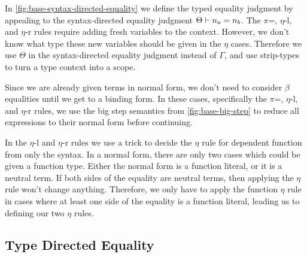 In \autoref{fig:base-syntax-directed-equality} we define the typed equality judgment by appealing to the syntax-directed equality judgment $\Theta \vdash n_a = n_b$.
The $\pi$=, $\eta$-l, and $\eta$-r rules require adding fresh variables to the context.
However, we don't know what type these new variables should be given in the $\eta$ cases.
Therefore we use $\Theta$ in the syntax-directed equality judgment instead of $\Gamma$, and use strip-types to turn a type context into a scope.

Since we are already given terms in normal form, we don't need to consider $\beta$ equalities until we get to a binding form.
In these cases, specifically the $\pi$=, $\eta$-l, and $\eta$-r rules, we use the big step semantics from \autoref{fig:base-big-step} to reduce all expressions to their normal form before continuing.

In the $\eta$-l and $\eta$-r rules we use a trick to decide the $\eta$ rule for dependent function from only the syntax.
In a normal form, there are only two cases which could be given a function type.
Either the normal form is a function literal, or it is a neutral term.
If both sides of the equality are neutral terms, then applying the $\eta$ rule won't change anything.
Therefore, we only have to apply the function $\eta$ rule in cases where at least one side of the equality is a function literal, leading us to defining our two $\eta$ rules.

\subsection{Type Directed Equality}

